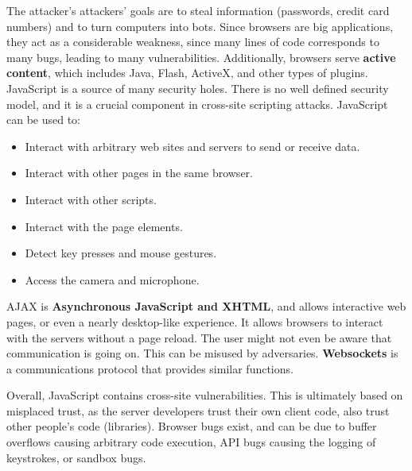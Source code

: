 \documentclass[11pt]{article}
\theoremstyle{plain} %
\theoremstyle{definition}
\theoremstyle{example}
\theoremstyle{remark}
\begin{document}
The attacker's attackers' goals are to steal information (passwords, credit card numbers) and to turn computers into bots. Since browsers are big applications, they act as a considerable weakness, since many lines of code corresponds to many bugs, leading to many vulnerabilities. Additionally, browsers serve \textbf{active content}, which includes Java, Flash, ActiveX, and other types of plugins. JavaScript is a source of many security holes. There is no well defined security model, and it is a crucial component in cross-site scripting attacks. JavaScript can be used to:
\begin{itemize}
	\item Interact with arbitrary web sites and servers to send or receive data.
	\item Interact with other pages in the same browser.
	\item Interact with other scripts.
	\item Interact with the page elements.
	\item Detect key presses and mouse gestures.
	\item Access the camera and microphone.
\end{itemize}
AJAX is \textbf{Asynchronous JavaScript and XHTML}, and allows interactive web pages, or even a nearly desktop-like experience. It allows browsers to interact with the servers without a page reload. The user might not even be aware that communication is going on. This can be misused by adversaries. \textbf{Websockets} is a communications protocol that provides similar functions. 

Overall, JavaScript contains cross-site vulnerabilities. This is ultimately based on misplaced trust, as the server developers trust their own client code, also trust other people's code (libraries). Browser bugs exist, and can be due to buffer overflows causing arbitrary code execution, API bugs causing the logging of keystrokes, or sandbox bugs. 
\end{document}
